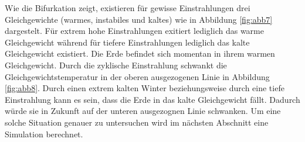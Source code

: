 \begin{refsection}
Wie die Bifurkation zeigt, existieren für gewisse Einstrahlungen
drei Gleichgewichte (warmes, instabiles und kaltes) wie in Abbildung
\ref{fig:abb7} dargestelt. Für extrem hohe Einstrahlungen exitiert
lediglich das warme Gleichgewicht während für tiefere Einstrahlungen
lediglich das kalte Gleichgewicht existiert. Die Erde befindet sich
momentan in ihrem warmen Gleichgewicht. Durch die zyklische
Einstrahlung schwankt die Gleichgewichtstemperatur in der oberen
ausgezogenen Linie in Abbildung \ref{fig:abb8}. Durch einen extrem
kalten Winter beziehungsweise durch eine tiefe Einstrahlung kann
es sein, dass die Erde in das kalte Gleichgewicht fällt. Dadurch
würde sie in Zukunft auf der unteren ausgezognen Linie schwanken.
Um eine solche Situation genauer zu untersuchen wird im nächsten
Abschnitt eine Simulation berechnet.



\end{refsection}
